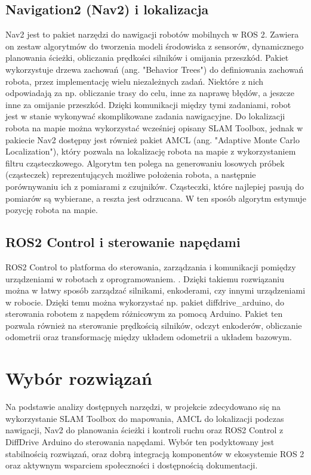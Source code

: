 \documentclass[a4paper,twoside,12pt]{book}
\begin{document}
\subsection{Navigation2 (Nav2) i lokalizacja}
Nav2 jest to pakiet narzędzi do nawigacji robotów mobilnych w ROS 2. Zawiera on zestaw algorytmów do tworzenia modeli środowiska z sensorów, dynamicznego planowania ścieżki, obliczania prędkości silników i omijania przeszkód. 
Pakiet wykorzystuje drzewa zachowań (ang. "Behavior Trees") do definiowania zachowań robota, przez implementację wielu niezależnych zadań. Niektóre z nich odpowiadają za np. obliczanie trasy do celu, inne za naprawę błędów, a jeszcze inne za omijanie przeszkód. Dzięki komunikacji między tymi zadaniami, robot jest w stanie wykonywać skomplikowane zadania nawigacyjne.
\cite{bib:abs-2003-00368}
\newline
\newline
Do lokalizacji robota na mapie można wykorzystać wcześniej opisany SLAM Toolbox, jednak w pakiecie Nav2 dostępny jest również pakiet AMCL (ang. "Adaptive Monte Carlo Localization"), który pozwala na lokalizację robota na mapie z wykorzystaniem filtru cząsteczkowego. Algorytm ten polega na generowaniu losowych próbek (cząsteczek) reprezentujących możliwe położenia robota, a następnie porównywaniu ich z pomiarami z czujników. Cząsteczki, które najlepiej pasują do pomiarów są wybierane, a reszta jest odrzucana. W ten sposób algorytm estymuje pozycję robota na mapie. \cite{bib:amcl}
\subsection{ROS2 Control i sterowanie napędami}
ROS2 Control to platforma do sterowania, zarządzania i komunikacji pomiędzy urządzeniami w robotach z oprogramowaniem. \cite{bib:ros2control}. Dzięki takiemu rozwiązaniu można w łatwy sposób zarządzać silnikami, enkoderami, czy innymi urządzeniami w robocie. Dzięki temu można wykorzystać np. pakiet diffdrive\_arduino, do sterowania robotem z napędem różnicowym za pomocą Arduino. Pakiet ten pozwala również na sterowanie prędkością silników, odczyt enkoderów, obliczanie odometrii oraz transformację między układem odometrii a układem bazowym. \cite{bib:diffdrive}
 

\section{Wybór rozwiązań}
Na podstawie analizy dostępnych narzędzi, w projekcie zdecydowano się na wykorzystanie SLAM Toolbox do mapowania, AMCL do lokalizacji podczas nawigacji, Nav2 do planowania ścieżki i kontroli ruchu oraz ROS2 Control z DiffDrive Arduino do sterowania napędami. Wybór ten podyktowany jest stabilnością rozwiązań, oraz dobrą integracją komponentów w ekosystemie ROS 2 oraz aktywnym wsparciem społeczności i dostępnością dokumentacji.
\end{document}
